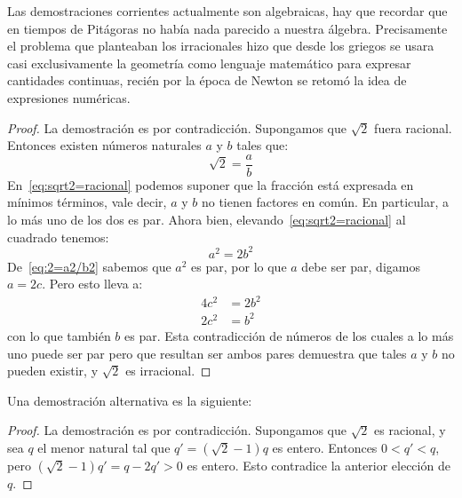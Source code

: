   Las demostraciones corrientes actualmente son algebraicas,
  hay que recordar que en tiempos de Pitágoras%
  no había nada parecido a nuestra álgebra.
  Precisamente el problema que planteaban los irracionales
  hizo que desde los griegos se usara casi exclusivamente
  la geometría como lenguaje matemático
  para expresar cantidades continuas,
  recién por la época de Newton%
  se retomó la idea de expresiones numéricas.
  \begin{proof}
    La demostración es por contradicción.%
    Supongamos que \(\sqrt{2}\) fuera racional.
    Entonces existen números naturales \(a\) y \(b\) tales que:
    \begin{equation}
      \label{eq:sqrt2=racional}
      \sqrt{2} = \frac{a}{b}
    \end{equation}
    En~\eqref{eq:sqrt2=racional} podemos suponer
    que la fracción está expresada en mínimos términos,
    vale decir,
    \(a\) y \(b\) no tienen factores en común.
    En particular,
    a lo más uno de los dos es par.
    Ahora bien,
    elevando~\eqref{eq:sqrt2=racional} al cuadrado tenemos:
    \begin{equation}
      \label{eq:2=a2/b2}
      a^2 = 2 b^2
    \end{equation}
    De~\eqref{eq:2=a2/b2} sabemos que \(a^2\) es par,
    por lo que \(a\) debe ser par,
    digamos \(a = 2 c\).
    Pero esto lleva a:
    \begin{align*}
      4 c^2
	&= 2 b^2 \\
      2 c^2
	&= b^2
    \end{align*}
    con lo que también \(b\) es par.
    Esta contradicción
    de números de los cuales a lo más uno puede ser par
    pero que resultan ser ambos pares
    demuestra que tales \(a\) y \(b\) no pueden existir,
    y \(\sqrt{2}\) es irracional.
  \end{proof}

  Una demostración alternativa es la siguiente:

  \begin{proof}
    La demostración es por contradicción.%
    Supongamos que \(\sqrt{2}\) es racional,
    y sea \(q\) el menor natural
    tal que \(q' = (\sqrt{2} - 1) q\) es entero.
    Entonces \(0 < q' < q\),
    pero \((\sqrt{2} - 1) q' = q - 2 q' > 0\) es entero.
    Esto contradice la anterior elección de \(q\).
  \end{proof}

